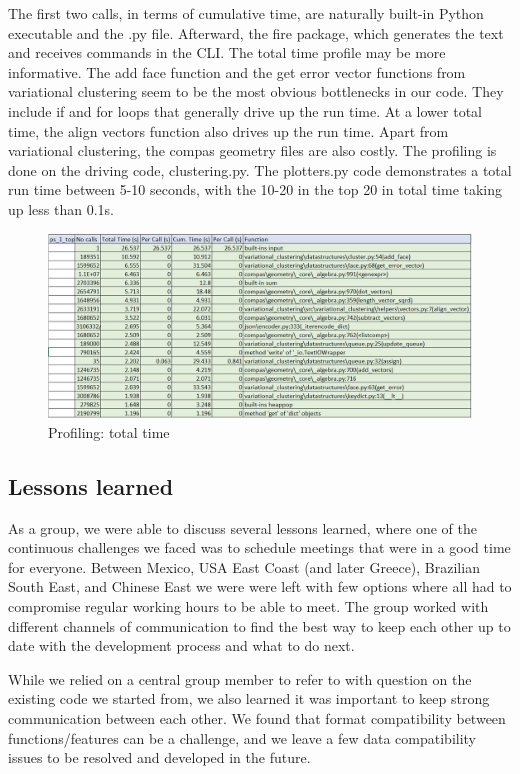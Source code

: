 \documentclass[11pt]{article}
\begin{document}
The first two calls, in terms of cumulative time, are naturally built-in Python executable and the .py file. Afterward, the fire package, which generates the text and receives commands in the CLI. The total time profile may be more informative. The add face function and the get error vector functions from variational clustering seem to be the most obvious bottlenecks in our code. They include if and for loops that generally drive up the run time. At a lower total time, the align vectors function also drives up the run time. Apart from variational clustering, the compas geometry files are also costly. The profiling is done on the driving code, clustering.py. The plotters.py code demonstrates a total run time between 5-10 seconds, with the 10-20 in the top 20 in total time taking up less than 0.1s.

\begin{figure}[H]
    \centering
    \includegraphics[scale=0.65]{Profiling2.JPG}
	\caption{Profiling: total time}
	\label{fig:uml}
\end{figure}


\subsection{Lessons learned}

As a group, we were able to discuss several lessons learned, where one of the continuous challenges we faced was to schedule meetings that were in a good time for everyone. Between Mexico, USA East Coast (and later Greece), Brazilian South East, and Chinese East we were were left with few options where all had to compromise regular working hours to be able to meet. The group worked with different channels of communication to find the best way to keep each other up to date with the development process and what to do next.

While we relied on a central group member to refer to with question on the existing code we started from, we also learned it was important to keep strong communication between each other. We found that format compatibility between functions/features can be a challenge, and we leave a few data compatibility issues to be resolved and developed in the future.
\end{document}
